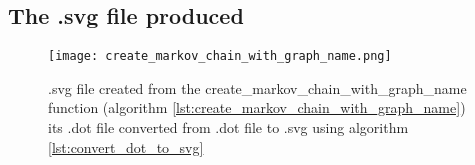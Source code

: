 \subsection{The .svg file produced}

\begin{figure}[!htbp]
  \texttt{[image: create\_markov\_chain\_with\_graph\_name.png]}
  \caption{
    .svg file created from the create\_markov\_chain\_with\_graph\_name function 
    (algorithm \ref{lst:create_markov_chain_with_graph_name}) 
    its .dot file converted from .dot file to .svg 
    using algorithm \ref{lst:convert_dot_to_svg}
  }
  \label{fig:create_markov_chain_with_graph_name.svg}
\end{figure}

